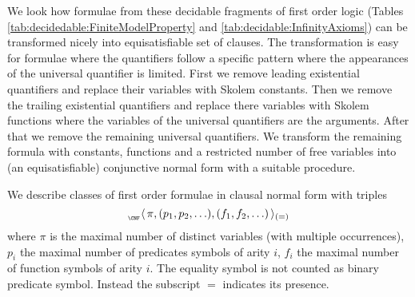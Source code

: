 


We look how formulae from these decidable fragments of first order logic
(Tables \ref{tab:decidedable:FiniteModelProperty} and \ref{tab:decidable:InfinityAxioms})
can be transformed nicely into equisatisfiable set of clauses.
The transformation is easy for formulae where the quantifiers follow a specific pattern where the appearances of the universal quantifier is limited. First we remove leading existential quantifiers and replace their variables with Skolem constants.
Then we remove the trailing existential quantifiers and replace there variables with Skolem functions where the variables of the universal quantifiers are the arguments. After that we remove the remaining universal quantifiers. We transform the remaining formula with constants, functions and a restricted number of free variables into (an equisatisfiable) conjunctive normal form with a suitable procedure.

\begin{definition}\label{def:prefix:class}
	We describe classes of first order formulae in clausal normal form with triples
	\[
	_{_\CNF}\langle\, \pi, (p_1,p_2,\ldots), (f_1,f_2,\ldots)\,\rangle_{(=)}
	\]
	where \( \pi \) is the maximal number of distinct variables (with multiple occurrences),
	\( p_i \) the maximal number of predicates symbols of arity \( i \),
	\( f_i \) the maximal number of function symbols of arity \( i \).
	The equality symbol is not counted as binary predicate symbol.
	Instead the subscript \( = \) indicates its presence.
\end{definition}

